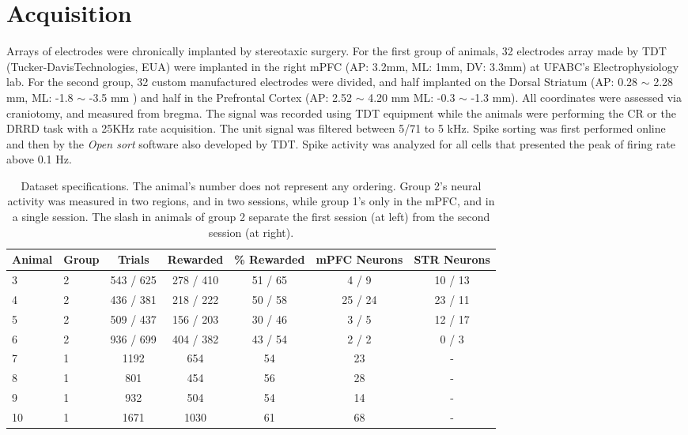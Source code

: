 \section{Acquisition}
\label{chap:acquisition}

Arrays of electrodes were chronically implanted by stereotaxic surgery. For the first group of animals, 32 electrodes array made by TDT (Tucker-DavisTechnologies, EUA) were implanted in the right mPFC (AP: 3.2mm, ML: 1mm, DV: 3.3mm) at UFABC's Electrophysiology lab. For the second group, 32 custom manufactured electrodes were divided, and half implanted on the Dorsal Striatum (AP: 0.28 $\sim$ 2.28 mm, ML: -1.8 $\sim$ -3.5 mm ) and half in the Prefrontal Cortex (AP: 2.52 $\sim$ 4.20 mm ML: -0.3 $\sim$ -1.3 mm). All coordinates were assessed via craniotomy, and measured from bregma.
The signal was recorded  using TDT equipment while the animals were performing the CR or the DRRD task with a 25KHz rate acquisition. The unit signal was filtered between 5/71 to 5 kHz. Spike sorting was first performed online and then by the \textit{Open sort} software also developed by TDT. Spike activity was analyzed for all cells that presented the peak of firing rate above 0.1 Hz. 
			
\begin{table}[htp]
    \centering
    \begin{tabular}{l|l|c|c|c|c|c}
        Animal & Group & Trials & Rewarded & \% Rewarded &  mPFC Neurons & STR Neurons \\\hline
        3 & 2 &  543 / 625  &    278 / 410 &   51 / 65 &       4 / 9    &   10 / 13 \\
        4 & 2 &  436 / 381  &    218 / 222 &  50 / 58  &      25 / 24   &   23 / 11 \\
        5 & 2 &  509 / 437  &    156 / 203 &  30 / 46  &      3 / 5     &   12 / 17 \\
        6 & 2 &  936 / 699  &    404 / 382 &  43 / 54  &      2 / 2     &   0 / 3   \\
        7 & 1 &     1192    &    654       &    54     &     23       &     -     \\
        8 & 1 &      801    &    454       &    56     &     28       &     -     \\
        9 & 1 &      932    &    504       &    54     &     14       &     -     \\
        10& 1 &     1671    &    1030      &    61     &     68       &     -     \\
    \end{tabular}
    \caption[Dataset specifications]{Dataset specifications. The animal's number does not represent any ordering. Group 2's neural activity was measured in two regions, and in two sessions, while group 1's only in the mPFC, and in a single session. The slash in animals of group 2 separate the first session (at left) from the second session (at right).}
    \label{tab:subjects}
\end{table}